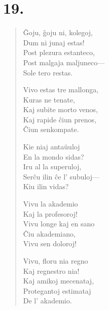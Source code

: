 \documentclass[ngerman,12pt,twoside]{book}
\begin{document}
\section*{19.}

{\centering{}\par}

\begin{verse}

\begin{patverse} \vin \vin 
Ĝoju, ĝoju ni, kolegoj,\\
Dum ni junaj estas!\\
Post plezura estanteco,\\
Post malgaja maljuneco---\\
Sole tero restas.
\end{patverse}

\pstars

\begin{patverse} \vin \vin 
Vivo estas tre mallonga,\\
Kuras ne tenate,\\
Kaj subite morto venos,\\
Kaj rapide ĉiun prenos,\\
Ĉiun senkompate.
\end{patverse}

\pstars

\newpage
\begin{patverse} \vin \vin
Kie niaj antaŭuloj\\
En la mondo sidas?\\
Iru al la superuloj,\\
Serĉu ilin ĉe l' subuloj---\\
Kiu ilin vidas?
\end{patverse}

\pstars

\begin{patverse} \vin \vin
Vivu la akademio\\
Kaj la profesoroj!\\
Vivu longe kaj en sano\\
Ĉiu akademiano,\\
Vivu sen doloroj!
\end{patverse}

\pstars

\begin{patverse} \vin \vin
Vivu, floru nia regno\\
Kaj regnestro nia!\\
Kaj amikoj mecenataj,\\
Protegantoj estimataj\\
De l' akademio.
\end{patverse}


\end{verse}
\end{document}
